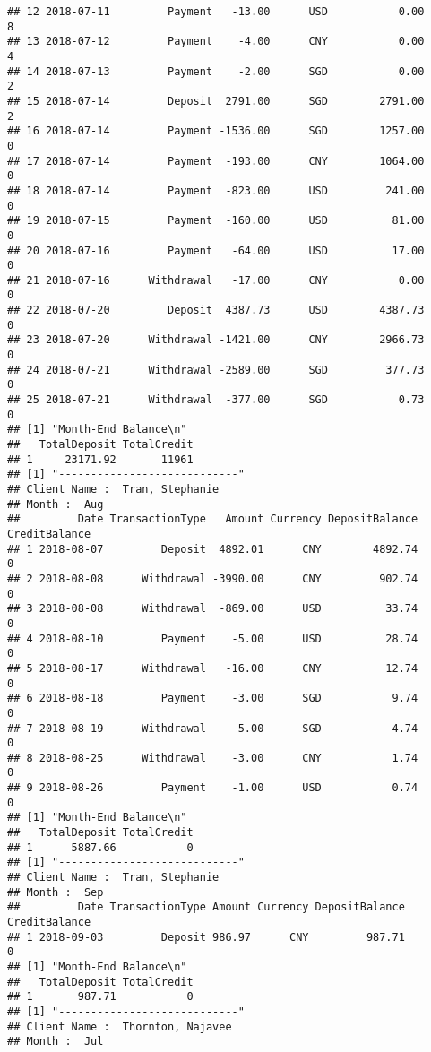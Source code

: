 \documentclass[]{article}
\begin{document}
\begin{verbatim}
## 12 2018-07-11         Payment   -13.00      USD           0.00             8
## 13 2018-07-12         Payment    -4.00      CNY           0.00             4
## 14 2018-07-13         Payment    -2.00      SGD           0.00             2
## 15 2018-07-14         Deposit  2791.00      SGD        2791.00             2
## 16 2018-07-14         Payment -1536.00      SGD        1257.00             0
## 17 2018-07-14         Payment  -193.00      CNY        1064.00             0
## 18 2018-07-14         Payment  -823.00      USD         241.00             0
## 19 2018-07-15         Payment  -160.00      USD          81.00             0
## 20 2018-07-16         Payment   -64.00      USD          17.00             0
## 21 2018-07-16      Withdrawal   -17.00      CNY           0.00             0
## 22 2018-07-20         Deposit  4387.73      USD        4387.73             0
## 23 2018-07-20      Withdrawal -1421.00      CNY        2966.73             0
## 24 2018-07-21      Withdrawal -2589.00      SGD         377.73             0
## 25 2018-07-21      Withdrawal  -377.00      SGD           0.73             0
## [1] "Month-End Balance\n"
##   TotalDeposit TotalCredit
## 1     23171.92       11961
## [1] "----------------------------"
## Client Name :  Tran, Stephanie 
## Month :  Aug 
##         Date TransactionType   Amount Currency DepositBalance CreditBalance
## 1 2018-08-07         Deposit  4892.01      CNY        4892.74             0
## 2 2018-08-08      Withdrawal -3990.00      CNY         902.74             0
## 3 2018-08-08      Withdrawal  -869.00      USD          33.74             0
## 4 2018-08-10         Payment    -5.00      USD          28.74             0
## 5 2018-08-17      Withdrawal   -16.00      CNY          12.74             0
## 6 2018-08-18         Payment    -3.00      SGD           9.74             0
## 7 2018-08-19      Withdrawal    -5.00      SGD           4.74             0
## 8 2018-08-25      Withdrawal    -3.00      CNY           1.74             0
## 9 2018-08-26         Payment    -1.00      USD           0.74             0
## [1] "Month-End Balance\n"
##   TotalDeposit TotalCredit
## 1      5887.66           0
## [1] "----------------------------"
## Client Name :  Tran, Stephanie 
## Month :  Sep 
##         Date TransactionType Amount Currency DepositBalance CreditBalance
## 1 2018-09-03         Deposit 986.97      CNY         987.71             0
## [1] "Month-End Balance\n"
##   TotalDeposit TotalCredit
## 1       987.71           0
## [1] "----------------------------"
## Client Name :  Thornton, Najavee 
## Month :  Jul 

\end{verbatim}
\end{document}
